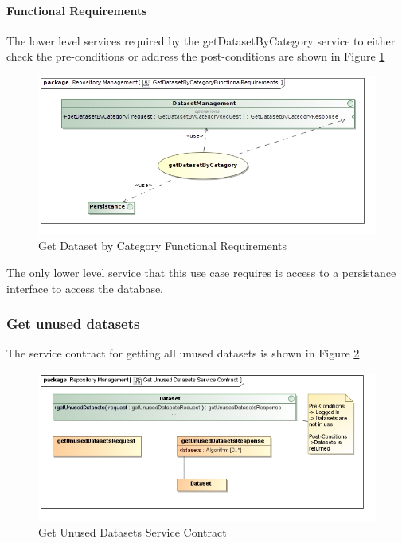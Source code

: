 \paragraph{Functional Requirements}
The lower level services required by the getDatasetByCategory service to either check the
pre-conditions or address the post-conditions are shown in Figure \ref{fig:getDatasetByCategoryFR}
\begin{figure}[H]
  \begin{center}
  \includegraphics[scale=0.6]{../Diagrams and Charts/Test Data/GetDatasetByCategoryFunctionalRequirements.jpg}
  \caption{Get Dataset by Category Functional Requirements}
  \label{fig:getDatasetByCategoryFR}
  \end{center}
\end{figure}

The only lower level service that this use case requires is access to
a persistance interface to access the database.

\subsubsection {Get unused datasets}
The service contract for getting all unused datasets is shown in Figure \ref{fig:getUnusedDatasetsService}
\begin{figure}[H]
  \begin{center}
  \includegraphics[scale=0.6]{../Diagrams and Charts/Test Data/Get Unused Datasets Service Contract.jpg}
  \caption{Get Unused Datasets Service Contract}
  \label{fig:getUnusedDatasetsService}
  \end{center}
  
\end{figure}

